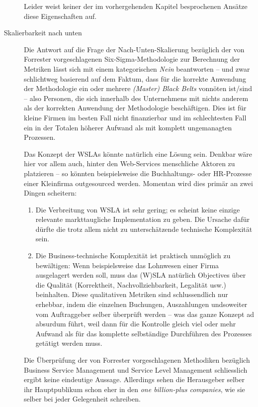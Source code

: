 \documentclass[11pt,listof=totoc]{scrreprt} %
\theoremstyle{definition}
\begin{document}
\begin{description}
Leider weist keiner der im vorhergehenden Kapitel besprochenen Ansätze diese Eigenschaften auf.

\item[Skalierbarkeit nach unten] Die Antwort auf die Frage der Nach-Unten-Skalierung bezüg\-lich der von Forrester vorgeschlagenen Six-Sigma-Methodologie zur Berechnung der Metriken lässt sich mit einem kategorischen {\em Nein} beantworten -- und zwar schlichtweg basierend auf dem Faktum, dass für die korrekte Anwendung der Methodologie ein oder mehrere {\em (Master) Black Belts} vonnöten ist/sind \cite{wiki:sixsigma} -- also Personen, die sich innerhalb des Unternehmens mit nichts anderem als der korrekten Anwendung der Methodologie beschäftigen. Dies ist für kleine Firmen im besten Fall nicht finanzierbar und im schlechtesten Fall ein in der Totalen höherer Aufwand als mit komplett ungemanagten Prozessen.

Das Konzept der WSLAs könnte natürlich eine Lösung sein. Denkbar wäre hier vor allem auch, hinter den Web-Services menschliche Aktoren zu platzieren -- so könnten beispielsweise die Buchhaltungs- oder HR-Prozesse einer Kleinfirma outgesourced werden. Momentan wird dies primär an zwei Dingen scheitern:
\begin{enumerate}
\item Die Verbreitung von WSLA ist sehr gering; es scheint keine einzige relevante markttaugliche Implementation zu geben. Die Ursache dafür dürfte die trotz allem nicht zu unterschätzende technische Komplexität sein.
\item Die Business-technische Komplexität ist praktisch unmöglich zu bewältigen: Wenn beispielsweise das Lohnwesen einer Firma ausgelagert werden soll, muss das (W)SLA natürlich Objectives über die Qualität (Korrektheit, Nachvollziehbarkeit, Legalität usw.) beinhalten. Diese qualitativen Metriken sind schlussendlich nur erhebbar, indem die einzelnen Buchungen, Auszahlungen undsoweiter vom Auftraggeber selber überprüft werden -- was das ganze Konzept ad absurdum führt, weil dann für die Kontrolle gleich viel oder mehr Aufwand als für das komplette selbständige Durchführen des Prozesses getätigt werden muss.
\end{enumerate}

Die Überprüfung der von Forrester vorgeschlagenen Methodiken bezüglich Business Service Management und Service Level Management schliesslich ergibt keine eindeutige Aussage. Allerdings sehen die Herausgeber selber ihr Hauptpublikum schon eher in den {\em one billion-plus companies}, wie sie selber bei jeder Gelegenheit schreiben.

\end{description}
\end{document}
